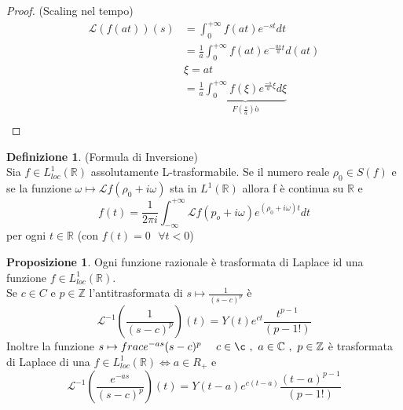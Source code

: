 \documentclass{article}
\theoremstyle{definition}
\newtheorem*{definizione}{Definizione}
\newtheorem*{proposizione}{Proposizione}
\newcommand{\R}{\mathbb{R}}
\newcommand{\C}{\mathbb{C}}
\newcommand{\intinf}{\int_{-\infty}^{+\infty}}
\begin{document}
\begin{proof}(Scaling nel tempo)
	\begin{align*}
	\mathscr{L}(f(at))(s)&=\int_{0}^{+\infty}f(at)e^{-st}dt \\
	& =\frac{1}{a}\int_{0}^{+\infty} f(at) e^{-\frac{as}{a}t}d(at)\\
	& \xi=at \\
	&=\frac{1}{a}\underbrace{\int_{0}^{+\infty}  f(\xi)e^{\frac{-s}{a}\xi} d\xi}_{F(\frac{s}{a})ò} \\
		\end{align*}
\end{proof}
\begin{definizione}(Formula di Inversione)\\
Sia $f \in L^1_{loc}(\R) $ assolutamente L-trasformabile. Se il numero reale $\rho_0 \in S(f)$  e se la funzione $\omega \mapsto \mathscr{L}f(\rho_0+i\omega)$ sta in $L^1(\R)$ allora f è continua su $\R$ e 
$$f(t)=\frac{1}{2\pi i} \intinf \mathscr{L}f(p_o+i\omega)e^{(\rho_0+i\omega)t}dt$$ 
per ogni $t 	\in \R$ (con $f(t)=0 \ \ \ \forall t <0$)
\end{definizione}
\begin{proposizione}
	Ogni funzione razionale è trasformata di Laplace  id una funzione $f \in L_{loc}^1(\R)$.\\
	Se $ c \in C $ e $p \in \mathbb{Z}$ l'antitrasformata di $s \mapsto \frac{1}{(s-c)^p}$ è 
	$$\mathscr{L}^{-1}\left(\frac{1}{(s-c)^p}\right)(t)=Y(t) e^{ct}\frac{t^{p-1}}{(p-1!)}$$
	Inoltre la funzione $s\mapsto frac{e^{-as}}{(s-c)^p} \ \ \ \ c \in \c \ , \ a \in \C \ , \ p \in \mathbb{Z}$ è trasformata di Laplace di una $f \in L_{loc}^1(\R) \iff a \in R_+ $  e
	$$\mathscr{L}^{-1}\left(\frac{e^{-as}}{(s-c)^p} \right)(t)=Y(t-a)e^{c(t-a)}\frac{(t-a)^{p-1}}{(p-1!)}$$ 
\end{proposizione}
\end{document}
